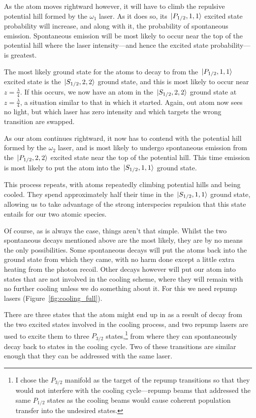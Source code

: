 As the atom moves rightward however, it will have to climb the repulsive potential hill formed by the $\omega_1$ laser. As it does so, its $\ket{P_{1/2}, 1,1}$ excited state probability will increase, and along with it, the probability of spontaneous emission. Spontaneous emission will be most likely to occur near the top of the potential hill where the laser intensity---and hence the excited state probability---is greatest.

The most likely ground state for the atoms to decay to from the $\ket{P_{1/2},1,1}$ excited state is the $\ket{S_{1/2}, 2,2}$ ground state, and this is most likely to occur near $z=\frac\lambda4$. If this occurs, we now have an atom in the $\ket{S_{1/2},2,2}$ ground state at $z=\frac\lambda4$, a situation similar to that in which it started. Again, out atom now sees no light, but which laser has zero intensity and which targets the wrong transition are swapped.

As our atom continues rightward, it now has to contend with the potential hill formed by the $\omega_2$ laser, and is most likely to undergo spontaneous emission from the $\ket{P_{1/2},2,2}$ excited state near the top of the potential hill. This time emission is most likely to put the atom into the $\ket{S_{1/2},1,1}$ ground state.

This process repeats, with atoms repeatedly climbing potential hills and being cooled. They spend approximately half their time in the $\ket{S_{1/2},1,1}$ ground state, allowing us to take advantage of the strong interspecies repulsion that this state entails for our two atomic species.

Of course, as is always the case, things aren't that simple. Whilst the two spontaneous decays mentioned above are the most likely, they are by no means the only possibilities. Some spontaneous decays will put the atoms back into the ground state from which they came, with no harm done except a little extra heating from the photon recoil. Other decays however will put our atom into states that are not involved in the cooling scheme, where they will remain with no further cooling unless we do something about it. For this we need repump lasers (Figure~\ref{fig:cooling_full}).

There are three states that the atom might end up in as a result of decay from the two excited states involved in the cooling process, and two repump lasers are used to excite them to three $P_{3/2}$ states,\footnote{I chose the $P_{3/2}$ manifold as the target of the repump transitions so that they would not interfere with the cooling cycle---repump beams that addressed the same $P_{1/2}$ states as the cooling beams would cause coherent population transfer into the undesired states.} from where they can spontaneously decay back to states in the cooling cycle. Two of these transitions are similar enough that they can be addressed with the same laser.

